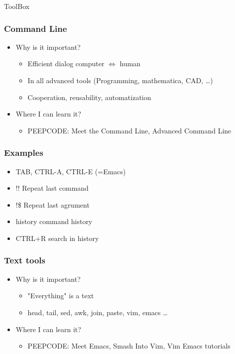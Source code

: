 \documentclass[fleqn]{beamer}
\begin{document}
\begin{section}{ToolBox}

  \begin{frame}\frametitle{Command Line}
  \begin{itemize}
    \item{Why is it important?}
    \begin{itemize}
      \item{Efficient dialog computer $\Longleftrightarrow$ human}
      \item{In all advanced tools (Programming, mathematica, CAD, \ldots)}
      \item{Cooperation, reusability, automatization }
    \end{itemize}

    \item{Where I can learn it?}
    \begin{itemize}
      \item PEEPCODE: Meet the Command Line, Advanced Command Line  
    \end{itemize}
  \end{itemize}


  \end{frame}

  \begin{frame}\frametitle{Examples}
  \begin{itemize}
    \item TAB, CTRL-A, CTRL-E (=Emacs)
    \item !! Repeat last command
    \item !\$ Repeat last agrument
    \item history command history
    \item CTRL+R search in history
  \end{itemize}
  \end{frame}

  
  \begin{frame}\frametitle{Text tools}
  \begin{itemize}
    \item{Why is it important?}
      \begin{itemize}
      \item "Everything" is a text
      \item head, tail, sed, awk, join, paste, vim, emacs \ldots
      \end{itemize}
 \item{Where I can learn it?}
  \begin{itemize}
      \item PEEPCODE: Meet Emacs, Smash Into Vim, Vim Emacs tutorials
  \end{itemize}
  \end{itemize}
  \end{frame}


\end{section}
\end{document}
